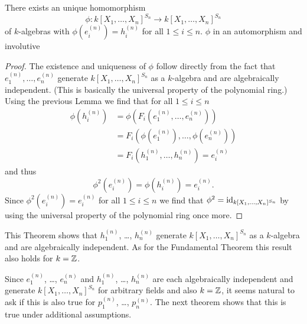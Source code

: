 \begin{thrm}
There exists an unique homomorphism
\[
          \phi
  \colon  k[X_1, \dotsc, X_n]^{S_n}
  \to     k[X_1, \dotsc, X_n]^{S_n}
\]
of $k$-algebras with $\phi\left(e^{(n)}_i\right) = h^{(n)}_i$ for all $1 \leq i \leq n$.
$\phi$ in an automorphism and involutive
\end{thrm}
\begin{proof}
  The existence and uniqueness of $\phi$ follow directly from the fact that $e^{(n)}_1, \dotsc, e^{(n)}_n$ generate $k[X_1, \dotsc, X_n]^{S_n}$ as a $k$-algebra and are algebraically independent.
  (This is basically the universal property of the polynomial ring.)
  Using the previous Lemma we find that for all $1 \leq i \leq n$
  \begin{align*}
        \phi\left(h^{(n)}_i\right)
    &=  \phi\left(F_i\left(e^{(n)}_1, \dotsc, e^{(n)}_n\right)\right) \\
    &=  F_i\left(\phi\left(e^{(n)}_1\right), \dotsc, \phi\left(e^{(n)}_n\right)\right) \\
    &=  F_i\left(h^{(n)}_1, \dotsc, h^{(n)}_n\right)
    =   e^{(n)}_i
  \end{align*}
  and thus
  \[
      \phi^2\left(e^{(n)}_i\right)
    = \phi\left(h^{(n)}_i\right) = e^{(n)}_i.
  \]
  Since $\phi^2\left(e^{(n)}_i\right) = e^{(n)}_i$ for all $1 \leq i \leq n$ we find that $\phi^2 = \operatorname{id}_{k[X_1, \dotsc, X_n]^{S_n}}$ by using the universal property of the polynomial ring once more.
\end{proof}


This Theorem shows that $h^{(n)}_1$, \dots, $h^{(n)}_n$ generate $k[X_1, \dotsc, X_n]^{S_n}$ as a $k$-algebra and are algebraically independent.
As for the Fundamental Theorem this result also holds for $k = \mathbb{Z}$.


Since $e^{(n)}_1$, \dots, $e^{(n)}_n$ and $h^{(n)}_1$, \dots, $h^{(n)}_n$ are each algebraically independent and generate $k[X_1, \dotsc, X_n]^{S_n}$ for arbitrary fields and also $k = \mathbb{Z}$, it seems natural to ask if this is also true for $p^{(n)}_1$, \dots, $p^{(n)}_n$.
The next theorem shows that this is true under additional assumptions.


